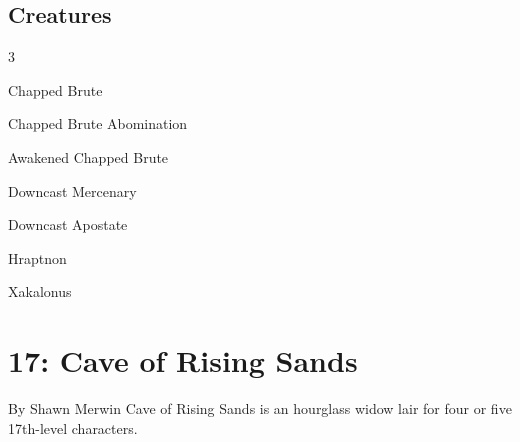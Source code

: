 \documentclass[10pt,a4paper,twoside,twocolumn,openany,bg=print,nodeprecatedcode]{dndbook}
\begin{document}
\section{Creatures}

\begin{itemize}
\begin{multicols}{3}
\item Chapped Brute
\item Chapped Brute Abomination
\item Awakened Chapped Brute
\item Downcast Mercenary
\item Downcast Apostate
\item Hraptnon
\item Xakalonus
\end{multicols}

\end{itemize}

\chapter{17: Cave of Rising Sands}
By Shawn Merwin
Cave of Rising Sands is an hourglass widow lair for four or five 17th-level characters.
\end{document}
